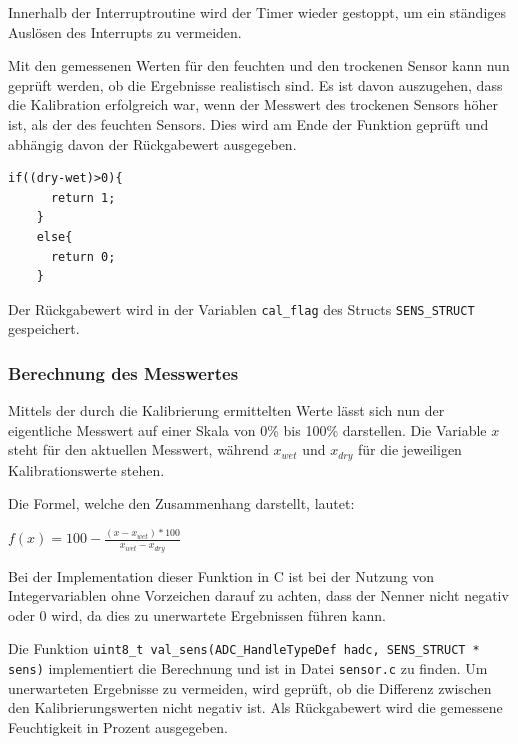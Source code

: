   \smallskip

  Innerhalb der Interruptroutine wird der Timer wieder gestoppt, um ein ständiges Auslösen des Interrupts zu vermeiden.

  \smallskip

  Mit den gemessenen Werten für den feuchten und den trockenen Sensor kann nun geprüft werden, ob die Ergebnisse realistisch sind. Es ist 
  davon auszugehen, dass die Kalibration erfolgreich war, wenn der Messwert des trockenen Sensors höher ist, als der des feuchten Sensors. 
  Dies wird am Ende der Funktion geprüft und abhängig davon der Rückgabewert ausgegeben.

  \begin{lstlisting}[caption={\textit{Prüfung Ergebnisse}}]
    if((dry-wet)>0){
      return 1;										
    }
    else{
      return 0;											
    }
  \end{lstlisting}

  Der Rückgabewert wird in der Variablen \lstinline!cal_flag! des Structs \lstinline!SENS_STRUCT! gespeichert.
  

  \newpage

  \subsubsection{Berechnung des Messwertes}
  \label{subsub: Messwert}
  Mittels der durch die Kalibrierung ermittelten Werte lässt sich nun der eigentliche Messwert auf einer Skala von 0\% bis
  100\% darstellen. Die Variable \(x\) steht für den aktuellen Messwert, während \(x_{wet}\) und \(x_{dry}\) für die jeweiligen Kalibrationswerte stehen. 

  \smallskip 

  Die Formel, welche den Zusammenhang darstellt, lautet:
  \smallskip
  \begin{center}
    
  \begin{math}
        f(x)=100-\frac{(x-x_{wet})*100}{x_{wet}-x_{dry}}
  \end{math}
  \end{center}
  
  Bei der Implementation dieser Funktion in C ist bei der Nutzung von Integervariablen ohne Vorzeichen darauf zu achten, dass der Nenner nicht negativ oder 0 wird,
  da dies zu unerwartete Ergebnissen führen kann.

  \smallskip

  Die Funktion \lstinline!uint8_t val_sens(ADC_HandleTypeDef hadc, SENS_STRUCT * sens)! implementiert die Berechnung und ist in Datei \lstinline!sensor.c! zu finden.
  Um unerwarteten Ergebnisse zu vermeiden, wird geprüft, ob die Differenz zwischen den Kalibrierungswerten nicht negativ ist. Als Rückgabewert wird die 
  gemessene Feuchtigkeit in Prozent ausgegeben.

